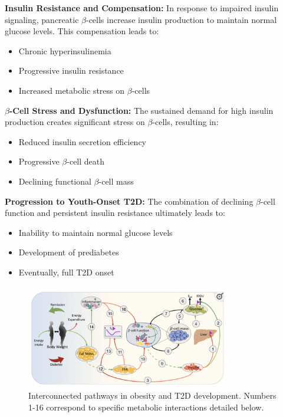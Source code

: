 \begin{multicols}{2}
\textbf{Insulin Resistance and Compensation:} In response to impaired insulin signaling, pancreatic $\beta$-cells increase insulin production to maintain normal glucose levels. This compensation leads to:
\begin{itemize}
    \item Chronic hyperinsulinemia
    \item Progressive insulin resistance
    \item Increased metabolic stress on $\beta$-cells
\end{itemize}

\textbf{$\beta$-Cell Stress and Dysfunction:} The sustained demand for high insulin production creates significant stress on $\beta$-cells, resulting in:
\begin{itemize}
    \item Reduced insulin secretion efficiency
    \item Progressive $\beta$-cell death
    \item Declining functional $\beta$-cell mass
\end{itemize}

\textbf{Progression to Youth-Onset T2D:} The combination of declining $\beta$-cell function and persistent insulin resistance ultimately leads to:
\begin{itemize}
    \item Inability to maintain normal glucose levels
    \item Development of prediabetes
    \item Eventually, full T2D onset
\end{itemize}

\end{multicols}

\begin{figure}[h]
\centering
\includegraphics[width=0.8\textwidth]{images/obesity_and_t2d_diagram.png}
\caption{Interconnected pathways in obesity and T2D development. Numbers 1-16 correspond to specific metabolic interactions detailed below.}
\label{fig:pathways}
\end{figure}

